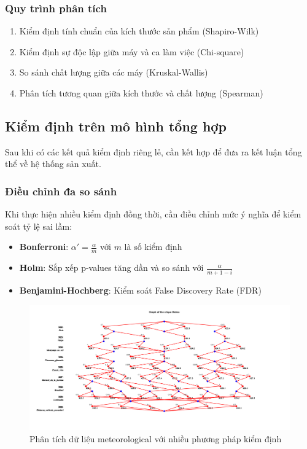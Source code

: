 \subsubsection*{Quy trình phân tích}
\begin{enumerate}
    \item Kiểm định tính chuẩn của kích thước sản phẩm (Shapiro-Wilk)
    \item Kiểm định sự độc lập giữa máy và ca làm việc (Chi-square)
    \item So sánh chất lượng giữa các máy (Kruskal-Wallis)
    \item Phân tích tương quan giữa kích thước và chất lượng (Spearman)
\end{enumerate}

\subsection{Kiểm định trên mô hình tổng hợp}
Sau khi có các kết quả kiểm định riêng lẻ, cần kết hợp để đưa ra kết luận tổng thể về hệ thống sản xuất.

\subsubsection*{Điều chỉnh đa so sánh}
Khi thực hiện nhiều kiểm định đồng thời, cần điều chỉnh mức ý nghĩa để kiểm soát tỷ lệ sai lầm:

\begin{itemize}
    \item \textbf{Bonferroni}: $\alpha' = \frac{\alpha}{m}$ với $m$ là số kiểm định
    \item \textbf{Holm}: Sắp xếp p-values tăng dần và so sánh với $\frac{\alpha}{m+1-i}$
    \item \textbf{Benjamini-Hochberg}: Kiểm soát False Discovery Rate (FDR)
\end{itemize}

\begin{figure}[h!]
    \centering
    \includegraphics[width=0.8\linewidth]{../../assets/images/fig_Meteo.png}
    \caption{Phân tích dữ liệu meteorological với nhiều phương pháp kiểm định}
\end{figure}

